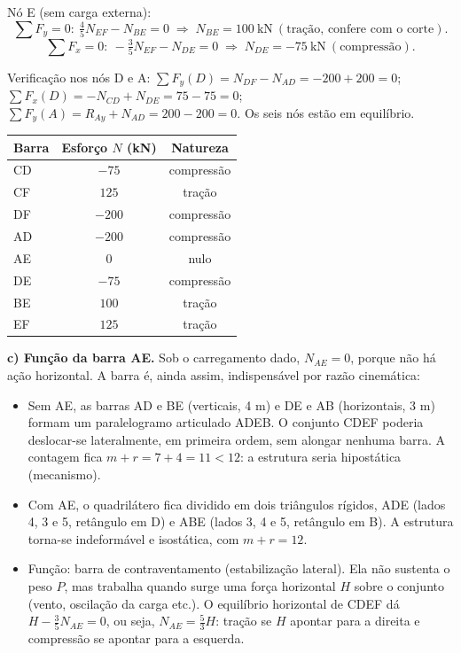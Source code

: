\documentclass{article}%
\begin{document}
Nó E (sem carga externa):
\[
\sum F_y=0:\ \tfrac45N_{EF}-N_{BE}=0\;\Rightarrow\;N_{BE}=100\ \text{kN}\ (\text{tração, confere com o corte}).
\]
\[
\sum F_x=0:\ -\tfrac35N_{EF}-N_{DE}=0\;\Rightarrow\;N_{DE}=-75\ \text{kN}\ (\text{compressão}).
\]

Verificação nos nós D e A: $\sum F_y(D)=N_{DF}-N_{AD}=-200+200=0$; $\sum F_x(D)=-N_{CD}+N_{DE}=75-75=0$; $\sum F_y(A)=R_{Ay}+N_{AD}=200-200=0$. Os seis nós estão em equilíbrio.

\begin{center}
\begin{tabular}{lcc}
Barra & Esforço $N$ (kN) & Natureza \\
\hline
CD & $-75$ & compressão \\
CF & $125$ & tração \\
DF & $-200$ & compressão \\
AD & $-200$ & compressão \\
AE & $0$ & nulo \\
DE & $-75$ & compressão \\
BE & $100$ & tração \\
EF & $125$ & tração \\
\end{tabular}
\end{center}

\textbf{c) Função da barra AE.} Sob o carregamento dado, $N_{AE}=0$, porque não há ação horizontal. A barra é, ainda assim, indispensável por razão cinemática:
\begin{itemize}
\item Sem AE, as barras AD e BE (verticais, 4 m) e DE e AB (horizontais, 3 m) formam um paralelogramo articulado ADEB. O conjunto CDEF poderia deslocar-se lateralmente, em primeira ordem, sem alongar nenhuma barra. A contagem fica $m+r=7+4=11<12$: a estrutura seria hipostática (mecanismo).
\item Com AE, o quadrilátero fica dividido em dois triângulos rígidos, ADE (lados 4, 3 e 5, retângulo em D) e ABE (lados 3, 4 e 5, retângulo em B). A estrutura torna-se indeformável e isostática, com $m+r=12$.
\item Função: barra de contraventamento (estabilização lateral). Ela não sustenta o peso $P$, mas trabalha quando surge uma força horizontal $H$ sobre o conjunto (vento, oscilação da carga etc.). O equilíbrio horizontal de CDEF dá $H-\tfrac35N_{AE}=0$, ou seja, $N_{AE}=\tfrac53H$: tração se $H$ apontar para a direita e compressão se apontar para a esquerda.
\end{itemize}
\end{document}
